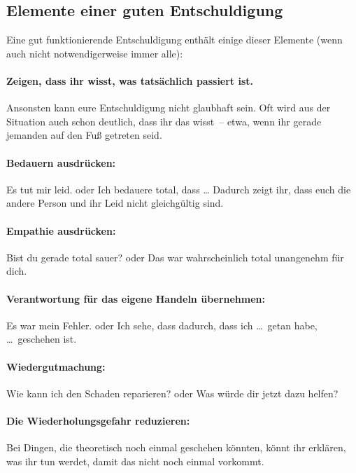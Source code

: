 \subsection{Elemente einer guten Entschuldigung}

Eine gut funktionierende Entschuldigung enthält einige dieser Elemente (wenn auch nicht notwendigerweise immer alle):

\paragraph{Zeigen, dass ihr wisst, was tatsächlich passiert ist.} Ansonsten kann eure Entschuldigung nicht glaubhaft sein. Oft wird aus der Situation auch schon deutlich, dass ihr das wisst~-- etwa, wenn ihr gerade jemanden auf den Fuß getreten seid.

\paragraph{Bedauern ausdrücken:} \glqq Es tut mir leid.\grqq{} oder \glqq Ich bedauere total, dass \ldots\grqq{} Dadurch zeigt ihr, dass euch die andere Person und ihr Leid nicht gleichgültig sind.

\paragraph{Empathie ausdrücken:} \glqq Bist du gerade total sauer?\grqq{} oder \glqq Das war wahrscheinlich total unangenehm für dich.\grqq

\paragraph{Verantwortung für das eigene Handeln übernehmen:} \glqq Es war mein Fehler.\grqq{} oder \glqq Ich sehe, dass dadurch, dass ich \ldots\ getan habe, \ldots\ geschehen ist.\grqq

\paragraph{Wiedergutmachung:} \glqq Wie kann ich den Schaden reparieren?\grqq{} oder \glqq Was würde dir jetzt dazu helfen?\grqq

\paragraph{Die Wiederholungsgefahr reduzieren:} Bei Dingen, die theoretisch noch einmal geschehen könnten, könnt ihr erklären, was ihr tun werdet, damit das nicht noch einmal vorkommt.

